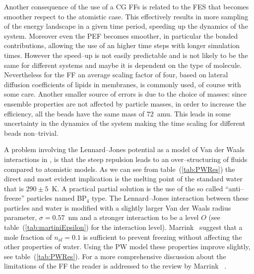Another consequence of the use of a \ac{CG} \acp{FF} is related to the \ac{FES} that becomes smoother respect to
the atomistic case. This effectively results in more sampling of the energy landscape in a given time period,
speeding up the dynamics of the system. Moreover even the \ac{PEF} becomes smoother, in particular the bonded
contributions, allowing the use of an higher time steps with longer simulation times. However the speed--up is
not easily predictable and is not likely to be the same for different systems and maybe it is dependent on the
type of molecule. Nevertheless for the \martini \ac{FF} an average scaling factor of four, based on lateral
diffusion coefficients of lipids in membranes, is commonly used, of course with some care. Another smaller source
of errors is due to the choice of masses: since ensemble properties are not affected by particle masses, in order
to increase the efficiency, all the \martini beads have the same mass of $72$~amu. This leads in some uncertainty
in the dynamics of the system making the time scaling for different beads non--trivial.

A problem involving the Lennard--Jones potential as a model of Van der Waals interactions in \martini, is that
the steep repulsion leads to an over--structuring of fluids compared to atomistic models. As we can see from
table~(\ref{tab:PWRes}) the direct and most evident implication is the melting point of the standard \martini
water that is $290 \pm 5$~K. A practical partial solution is the use of the so called ``anti--freeze'' particles
named BP$_4$ type. The Lennard--Jones interaction between these particles and water is modified with a slightly
larger Van der Waals radius parameter, $\sigma = 0.57$~nm and a stronger interaction to be a level $O$ (see
table~(\ref{tab:martiniEpsilon}) for the interaction level). Marrink \etal\, suggest that a mole fraction of
$n_{\text{af}} = 0.1$ is sufficient to prevent freezing without affecting the other properties of water.
Using the \ac{PW} model these properties improve slightly, see table~(\ref{tab:PWRes}). For a more comprehensive
discussion about the limitations of the \martini \ac{FF} the reader is addressed to the review by Marrink \etal\, \cite{MartiniReview}.

